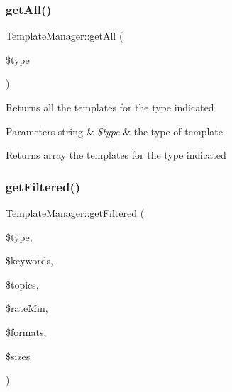 \subsubsection{\texorpdfstring{get\+All()}{getAll()}}
{\footnotesize\ttfamily Template\+Manager\+::get\+All (\begin{DoxyParamCaption}\item[{}]{\$type }\end{DoxyParamCaption})}

Returns all the templates for the type indicated 
\begin{DoxyParams}[1]{Parameters}
string & {\em \$type} & the type of template \\
\hline
\end{DoxyParams}
\begin{DoxyReturn}{Returns}
array the templates for the type indicated 
\end{DoxyReturn}
\mbox{\label{classTemplateManager_add74211b79e636840d1ce1de348d1036}} 
\subsubsection{\texorpdfstring{get\+Filtered()}{getFiltered()}}
{\footnotesize\ttfamily Template\+Manager\+::get\+Filtered (\begin{DoxyParamCaption}\item[{}]{\$type,  }\item[{}]{\$keywords,  }\item[{}]{\$topics,  }\item[{}]{\$rate\+Min,  }\item[{}]{\$formats,  }\item[{}]{\$sizes }\end{DoxyParamCaption})}

